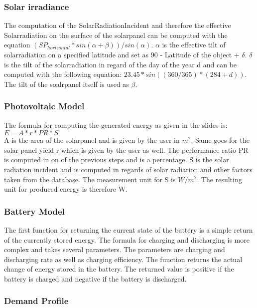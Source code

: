 \subsubsection{Solar irradiance}
The computation of the SolarRadiationIncident and therefore the effective Solarradiation on the surface of the solarpanel can be computed with the equation $(SP_{horizontal} * sin(\alpha + \beta))/sin(\alpha)$.
$\alpha$ is the effective tilt of solarradiation on a specified latitude and set as 90 - Latitude of the object + $\delta$.
$\delta$ is the tilt of the solarradiation in regard of the day of the year d and can be computed with the following equation: $23.45 * sin((360/365) * (284 + d))$.
The tilt of the soalrpanel itself is used as $\beta$.\cite{SolarRadiation}
\subsubsection{Photovoltaic Model}
The formula for computing the generated energy as given in the slides is: $E = A * r * PR * S$\\
A is the area of the solarpanel and is given by the user in $m^{2}$.
Same goes for the solar panel yield r which is given by the user as well.
The performance ratio PR  is computed in on of the previous steps and is  a percentage.
S is the solar radiation incident and is computed in regards of solar radiation and other factors taken from the database.
The measurement unit for S is $W/m^{2}$.
The resulting unit for produced energy is therefore W.
\subsubsection{Battery Model}
The first function for returning the current state of the battery is a simple return of the currently stored energy.
The formula for charging and discharging is more complex and takes several parameters.
The parameters are charging and discharging rate as well as charging efficiency.
The function returns the actual change of energy stored in the battery.
The returned value is positive if the battery is charged and negative if the battery is discharged.
\subsubsection{Demand Profile}\label{subsec:Demand}
